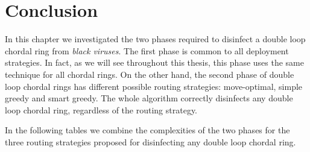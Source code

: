\section{Conclusion}  


In this chapter we investigated the two phases required to disinfect a double loop chordal ring from {\it black viruses}.  
The first phase is common to all deployment strategies. In fact, as we will see throughout this thesis, this phase uses the same technique for all chordal rings. On the other hand, the second phase of double loop chordal rings has different possible routing strategies: move-optimal, simple greedy and smart greedy. The whole algorithm correctly disinfects any double loop chordal ring, regardless of the routing strategy.

%
In the following tables we combine the complexities of the two phases for the three routing strategies proposed for disinfecting any double loop chordal ring.

